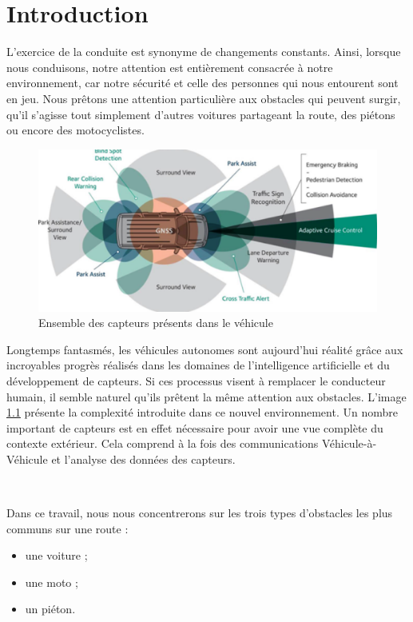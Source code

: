 \documentclass[a4paper]{report}
\begin{document}
\chapter{Introduction}

L'exercice de la conduite est synonyme de changements constants. Ainsi, lorsque nous conduisons, notre attention est entièrement consacrée à notre environnement, car notre sécurité et celle des personnes qui nous entourent sont en jeu. Nous prêtons une attention particulière aux obstacles qui peuvent surgir, qu'il s'agisse tout simplement d'autres voitures partageant la route, des piétons ou encore des motocyclistes.

\begin{figure}
	\centering
	\includegraphics[width=\textwidth]{img/sensors.png}
	\caption{Ensemble des capteurs présents dans le véhicule\label{sensors}}
\end{figure}

Longtemps fantasmés, les véhicules autonomes sont aujourd'hui réalité grâce aux incroyables progrès réalisés dans les domaines de l'intelligence artificielle et du développement de capteurs. Si ces processus visent à remplacer le conducteur humain, il semble naturel qu'ils prêtent la même attention aux obstacles. L'image \ref{sensors} présente la complexité introduite dans ce nouvel environnement. Un nombre important de capteurs est en effet nécessaire pour avoir une vue complète du contexte extérieur. Cela comprend à la fois des communications Véhicule-à-Véhicule et l'analyse des données des capteurs.

~\par

Dans ce travail, nous nous concentrerons sur les trois types d'obstacles les plus communs sur une route :
\begin{itemize}
\item une voiture ;
\item une moto ;
\item un piéton.

\end{itemize}
\end{document}
